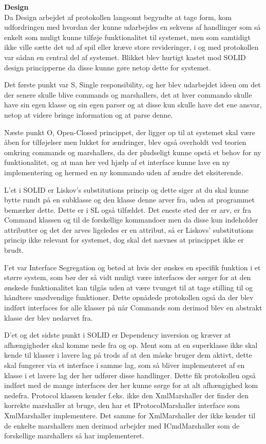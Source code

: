 \textbf{Design}\\

Da Design arbejdet af protokollen langsomt begyndte at tage form, kom udfordringen med hvordan der kunne udarbejdes en sekvens af handlinger som så enkelt som muligt kunne tilføje funktionalitet til systemet, men som samtidigt ikke ville sætte det ud af spil eller kræve store revideringer, i og med protokollen var sådan en central del af systemet. Blikket blev hurtigt kastet mod SOLID design principperne da disse kunne gøre netop dette for systemet.

Det første punkt var S, Single responsibility, og her blev udarbejdet ideen om det der senere skulle blive commands og marshallers, det at hver commando skulle have sin egen klasse og sin egen parser og at disse kun skulle have det ene ansvar, netop at videre bringe information og at parse denne.

Næste punkt O, Open-Closed princippet, der ligger op til at systemet skal være åben for tilføjelser men lukket for ændringer, blev også overholdt ved teorien omkring commands og marshallers, da der pludseligt kunne opstå et behov for ny funktionalitet, og at man her ved hjælp af et interface kunne lave en ny implementering og hermed en ny kommando uden af ændre det eksiterende.

L'et i SOLID er Liskov's substitutions princip og dette siger at du skal kunne bytte rundt på en subklasse og den klasse denne arver fra, uden at programmet bemærker dette. Dette er i \gls{SL} også tilfældet. Det eneste sted der er arv, er fra Command klassen og til de forskellige kommandoer men da disse kun indeholder attributter og det der arves ligeledes er en attribut, så er Liskovs' substitutions princip ikke relevant for systemet, dog skal det nævnes at princippet ikke er brudt.

I'et var Interface Segregation og betød at hvis der ønskes en specifik funktion i et større system, som bør der så vidt muligt være interfaces der sørger for at den ønskede funktionalitet kan tilgås uden at være tvunget til at tage stilling til og håndtere unødvendige funktioner. Dette opnådede protokollen også da der blev indført interfaces for alle klasser på når Commands som derimod blev en abstrakt klasse der blev nedarvet fra.

D'et og det sidste punkt i SOLID er Dependency inversion og kræver at afhængigheder skal komme nede fra og op. Ment som at en superklasse ikke skal kende til klasser i lavere lag på trods af at den måske bruger dem aktivt, dette skal fungerer via et interface i samme lag, som så bliver implementeret af en klasse i et lavere lag der her udfører disse handlinger. Dette fik protokollen også indført med de mange interfaces der her kunne sørge for at alt afhængighed kom nedefra. Protocol klassen kender f.eks. ikke den XmlMarshaller der finder den korrekte marshaller at bruge, den har et IProtocolMarshaller interface som XmlMarshaller implementere. Det samme for XmlMarshaller der ikke kender til de enkelte marshallers men derimod arbejder med ICmdMarshaller som de forskellige marshallers så har implementeret.\\

